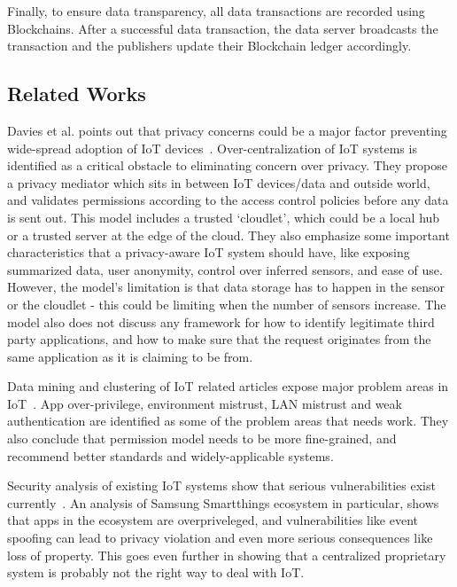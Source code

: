 Finally, to ensure data transparency, all data transactions are recorded using Blockchains. After a successful data transaction, the data server broadcasts the transaction and the publishers update their Blockchain ledger accordingly. 

\subsection{Related Works}
Davies et al. points out that privacy concerns could be a major factor preventing wide-spread adoption of IoT devices~\cite{davies}. Over-centralization of IoT systems is identified as a critical obstacle to eliminating concern over privacy. They propose a privacy mediator which sits in between IoT devices/data and outside world, and validates permissions according to the access control policies before any data is sent out. This model includes a trusted `cloudlet', which could be a local hub or a trusted server at the edge of the cloud. They also emphasize some important characteristics that a privacy-aware IoT system should have, like exposing summarized data, user anonymity, control over inferred sensors, and ease of use. However, the model's limitation is that data storage has to happen in the sensor or the cloudlet - this could be limiting when the number of sensors increase. The model also does not discuss any framework for how to identify legitimate third party applications, and how to make sure that the request originates from the same application as it is claiming to be from.

Data mining and clustering of IoT related articles expose major problem areas in IoT~\cite{zhang}. App over-privilege, environment mistrust, LAN mistrust and weak authentication are identified as some of the problem areas that needs work. They also conclude that permission model needs to be more fine-grained, and recommend better standards and widely-applicable systems.

Security analysis of existing IoT systems show that serious vulnerabilities exist currently~\cite{smartthings}. An analysis of Samsung Smartthings ecosystem in particular, shows that apps in the ecosystem are overpriveleged, and vulnerabilities like event spoofing can lead to privacy violation and even more serious consequences like loss of property. This goes even further in showing that a centralized proprietary system is probably not the right way to deal with IoT.

